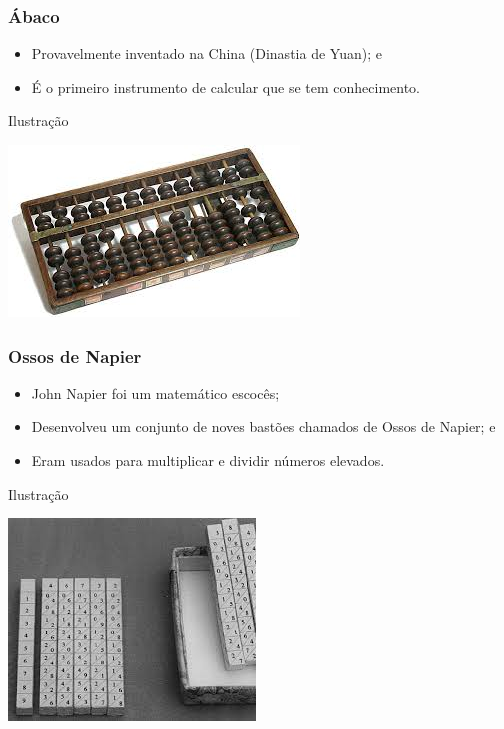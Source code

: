 \documentclass[aspectratio=169]{beamer} %
\begin{document}
\begin{frame}
	\frametitle{Ábaco}
	
	\begin{itemize}
		\item Provavelmente inventado na China (Dinastia de Yuan); e
		\item É o primeiro instrumento de calcular que se tem conhecimento.
	\end{itemize}\vfill
	
	\begin{exampleblock}{Ilustra\c cão}
		\begin{center}
			\includegraphics[scale=0.5]{img/abaco}
		\end{center}
	\end{exampleblock}
\end{frame}

\begin{frame}
	\frametitle{Ossos de Napier}
	
	\begin{itemize}
		\item John Napier foi um matemático escocês;
		\item Desenvolveu um conjunto de noves bastões chamados de Ossos de Napier; e
		\item Eram usados para multiplicar e dividir números elevados.
	\end{itemize}\vfill
	
	\begin{exampleblock}{Ilustra\c cão}
		\begin{center}
			\includegraphics[scale=0.5]{img/ossos_napier}
		\end{center}
	\end{exampleblock}
\end{frame}
\end{document}
